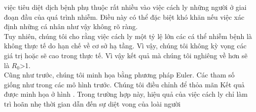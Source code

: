 \documentclass[12pt]{scrartcl}
\begin{document}
 việc tiêu diệt dịch bệnh phụ thuộc rất nhiều vào việc cách ly những người ở giai đoạn đầu của quá trình
 nhiễm. Điều này có thể đặc biệt khó khăn nếu việc xác định những cá nhân như vậy không rõ ràng.
 \newline
 \\
  Tuy nhiên, chúng tôi cho rằng việc cách ly một tỷ lệ lớn các cá thể nhiễm bệnh là không thực tế do hạn chế
 về cơ sở hạ tầng. Vì vậy, chúng tôi không kỳ vọng các giá trị  hoặc  sẽ cao trong thực tế. Vì vậy kết quả mà chúng tôi nghiêng về hơn sẽ là $R_0$>1.
 \newline
 \\
 Cũng như trước, chúng tôi minh họa bằng phương pháp Euler. Các tham số giống như trong các mô hình
 trước. Chúng tôi điều chỉnh  để thỏa mãn  Kết quả được minh họa ở hình . Trong trường
 hợp này, hiệu quả của việc cách ly chỉ làm trì hoãn nhẹ thời gian dẫn đến sự diệt vong của loài người
\end{document}

